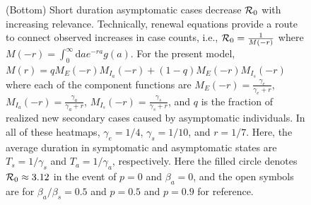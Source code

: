 \begin{figure}[b!]
\begin{center}
{(Bottom) Short duration asymptomatic cases decrease ${\cal{R}}_0$ with increasing relevance.
Technically, renewal equations provide a route to connect
observed increases in case counts, i.e., ${\cal{R}}_0 = \frac{1}{M(-r)}$
where $M(-r)=\int_0^{\infty}\mathrm{d} a e^{-ra}g(a)$.
For the present model,
$M(r)=qM_E(-r)M_{I_a}(-r)+(1-q)M_E(-r)M_{I_s}(-r)$
where each of the component functions are $M_E(-r)=\frac{\gamma_e}{\gamma_e+r}$,
$M_{I_a}(-r)=\frac{\gamma_a}{\gamma_a+r}$, 
$M_{I_s}(-r)=\frac{\gamma_s}{\gamma_s+r}$,
and $q$ is the fraction of realized new secondary cases caused by
asymptomatic individuals.  In all of these heatmaps, $\gamma_e=1/4$,
$\gamma_s=1/10$, and $r=1/7$. Here, the average duration
in symptomatic and asymptomatic states are $T_s=1/\gamma_s$ and 
$T_a=1/\gamma_a$, respectively. Here the filled circle denotes ${\cal{R}}_0\approx 3.12$
in the event of $p=0$ and $\beta_a=0$, and the open symbols are for $\beta_a/\beta_s=0.5$ and 
$p=0.5$ and $p=0.9$ for reference.
\label{fig.relevance}}
\end{center}
\end{figure}


